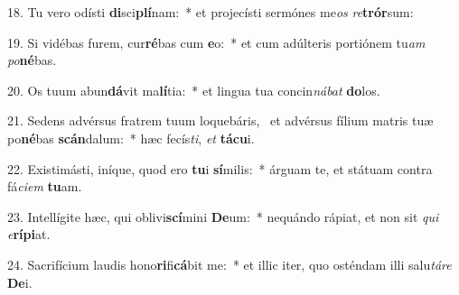 18. Tu vero odísti \textbf{di}sci\textbf{plí}nam:~*  et projecísti sermónes me\textit{os} \textit{re}\textbf{trór}sum:\

19. Si vidébas furem, cur\textbf{ré}bas cum \textbf{e}o:~*  et cum adúlteris portiónem tu\textit{am} \textit{po}\textbf{né}bas.\

20. Os tuum abun\textbf{dá}vit ma\textbf{lí}tia:~*  et lingua tua concin\textit{ná}\textit{bat} \textbf{do}los.\

21. Sedens advérsus fratrem tuum loquebáris, \dag\  et advérsus fílium matris tuæ po\textbf{né}bas \textbf{scán}dalum:~*  hæc fecís\textit{ti}, \textit{et} \textbf{tá}\textbf{cu}i.\

22. Existimásti, iníque, quod ero \textbf{tu}i \textbf{sí}milis:~*  árguam te, et státuam contra fá\textit{ci}\textit{em} \textbf{tu}am.\

23. Intellígite hæc, qui oblivi\textbf{scí}mini \textbf{De}um:~*  nequándo rápiat, et non sit \textit{qui} \textit{e}\textbf{rí}\textbf{pi}at.\

24. Sacrifícium laudis hono\textbf{ri}fi\textbf{cá}bit me:~*  et illic iter, quo osténdam illi salu\textit{tá}\textit{re} \textbf{De}i.\

